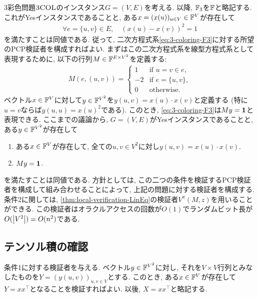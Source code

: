   3彩色問題$\textsc{3COL}$のインスタンス$G=(V,E)$を考える.
  以降, $\mathbb{F}_3$を$\mathbb{F}$と略記する.
  これがYesインスタンスであることと, ある$x=(x(u))_{u\in V}\in\mathbb{F}^V$が存在して
  \begin{align}
    \forall e=\{u,v\}\in E, \quad (x(u) - x(v))^2 = 1 \label{eq:3-coloring-F3}
  \end{align}
  を満たすことは同値である. 従って, 二次方程式系\cref{eq:3-coloring-F3}に対する所望のPCP検証者を構成すればよい.
  まずはこの二次方程式系を線型方程式系として表現するために, 以下の行列$M \in \mathbb{F}^{E \times V^2}$を定義する:
  \begin{align*}
    M(e, (u,v)) = \begin{cases}
      1 & \text{if } u=v\in e,\\
      -2 & \text{if } e=\{u,v\},\\
      0 & \text{otherwise}.
    \end{cases}
  \end{align*}
  ベクトル$x\in\mathbb{F}^V$に対して$y\in\mathbb{F}^{V^2}$を$y(u,v)=x(u)\cdot x(v)$と定義する (特に$u=v$ならば$y(u,u)=x(u)^2$である).
  このとき, \cref{eq:3-coloring-F3}は$My=\mathbf{1}$と表現できる.
  ここまでの議論から, $G=(V,E)$がYesインスタンスであることと, ある$y\in \mathbb{F}^{V^2}$が存在して
  \begin{enumerate}
    \item ある$x\in\mathbb{F}^V$が存在して, 全ての$u,v\in V^2$に対し$y(u,v)=x(u)\cdot x(v)$.
    \item $My=\mathbf{1}$.
  \end{enumerate}
  を満たすことは同値である.
  方針としては, この二つの条件を検証するPCP検証者を構成して組み合わせることによって, 上記の問題に対する検証者を構成する.
  条件2に関しては, \cref{thm:local-verification-LinEq}の検証者$V^\pi(M,z)$を用いることができる.
  この検証者はオラクルアクセスの回数が$O(1)$でランダムビット長が$O(\abs{V^2})=O(n^2)$である.
  
  \subsection{テンソル積の確認}
  条件1に対する検証者を与える.
  ベクトル$y\in\mathbb{F}^{V^2}$に対し, それを$V\times V$行列とみなしたものを$Y=(y(u,v))_{u,v\in V}$とする.
  このとき, ある$x\in\mathbb{F}^V$が存在して$Y=x x^\top$となることを検証すればよい.
  以後, $X=xx^\top$と略記する.
  
